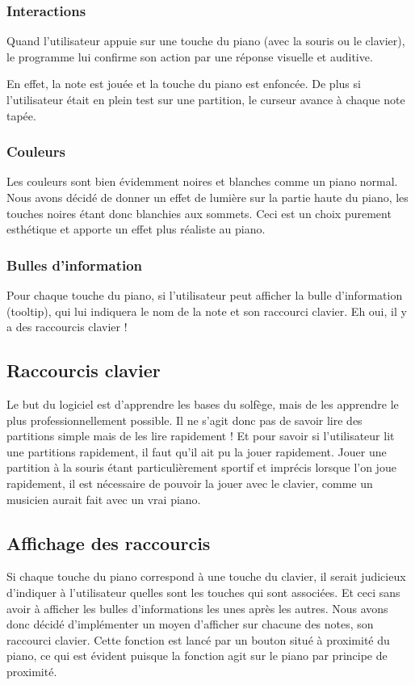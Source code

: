 \documentclass{article}
\begin{document}
\subsubsection{Interactions}
Quand l'utilisateur appuie sur une touche du piano (avec la souris ou le clavier),
le programme lui confirme son action par une réponse visuelle et auditive.


En effet, la note est jouée et la touche du piano est enfoncée. De plus si l'utilisateur était en plein test sur une partition,
le curseur avance à chaque note tapée.
\subsubsection{Couleurs}
Les couleurs sont bien évidemment noires et blanches comme un piano normal. Nous avons décidé de donner un effet de lumière 
sur la partie haute du piano, les touches noires étant donc blanchies aux sommets. Ceci est un choix purement esthétique et 
apporte un effet plus réaliste au piano.
\subsubsection{Bulles d'information}
Pour chaque touche du piano, si l'utilisateur peut afficher la bulle d'information (tooltip), qui lui indiquera le nom de la 
note et son raccourci clavier. Eh oui, il y a des raccourcis clavier !
\subsection{Raccourcis clavier}
Le but du logiciel est d'apprendre les bases du solfège, mais de les apprendre le plus professionnellement possible.
Il ne s’agit donc pas de savoir lire des partitions simple mais de les lire rapidement !
Et pour savoir si l'utilisateur lit une partitions rapidement, il faut qu'il ait pu la jouer rapidement.
Jouer une partition à la souris étant particulièrement sportif et imprécis lorsque l'on joue rapidement, il est nécessaire
de pouvoir la jouer avec le clavier, comme un musicien aurait fait avec un vrai piano.
\subsection{Affichage des raccourcis}
Si chaque touche du piano correspond à une touche du clavier, il serait judicieux d'indiquer à l'utilisateur quelles sont les touches
qui sont associées. Et ceci sans avoir à afficher les bulles d'informations les unes après les autres. Nous avons donc décidé d'implémenter
un moyen d'afficher sur chacune des notes, son raccourci clavier. Cette fonction est lancé par un bouton situé à proximité du piano, ce qui
est évident puisque la fonction agit sur le piano par principe de proximité.
\end{document}
